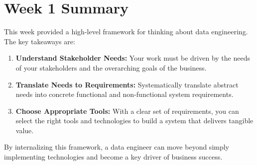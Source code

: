 \documentclass{article}
\begin{document}
\section{Week 1 Summary}
This week provided a high-level framework for thinking about data engineering. The key takeaways are:
\begin{enumerate}
    \item \textbf{Understand Stakeholder Needs:} Your work must be driven by the needs of your stakeholders and the overarching goals of the business.
    \item \textbf{Translate Needs to Requirements:} Systematically translate abstract needs into concrete functional and non-functional system requirements.
    \item \textbf{Choose Appropriate Tools:} With a clear set of requirements, you can select the right tools and technologies to build a system that delivers tangible value.
\end{enumerate}
By internalizing this framework, a data engineer can move beyond simply implementing technologies and become a key driver of business success.
\end{document}
